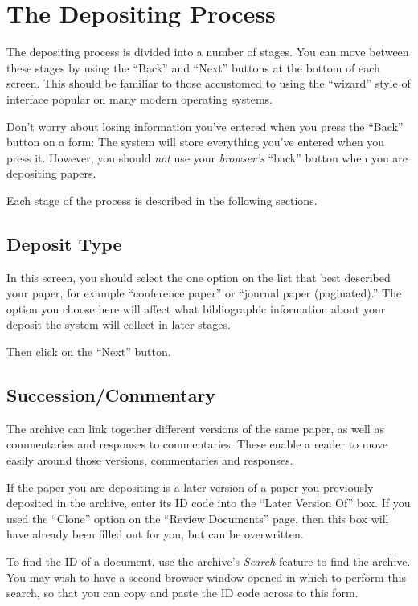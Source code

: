 \section{The Depositing Process}


The depositing process is divided into a number of stages. You can move between these stages by using the ``Back'' and ``Next'' buttons at the bottom of each screen. This should be familiar to those accustomed to using the ``wizard'' style of interface popular on many modern operating systems.

Don't worry about losing information you've entered when you press the ``Back'' button on a form: The system will store everything you've entered when you press it. However, you should \emph{not} use your \emph{browser's} ``back'' button when you are depositing papers.

Each stage of the process is described in the following sections.


\subsection{Deposit Type}

In this screen, you should select the one option on the list that best described your paper, for example ``conference paper'' or ``journal paper (paginated).'' The option you choose here will affect what bibliographic information about your deposit the system will collect in later stages.

Then click on the ``Next'' button.


\subsection{Succession/Commentary}

The archive can link together different versions of the same paper, as well as commentaries and responses to commentaries. These enable a reader to move easily around those versions, commentaries and responses.

If the paper you are depositing is a later version of a paper you previously deposited in the archive, enter its ID code into the ``Later Version Of'' box. If you used the ``Clone'' option on the ``Review Documents'' page, then this box will have already been filled out for you, but can be overwritten.

To find the ID of a document, use the archive's \emph{Search} feature to find the archive. You may wish to have a second browser window opened in which to perform this search, so that you can copy and paste the ID code across to this form.

